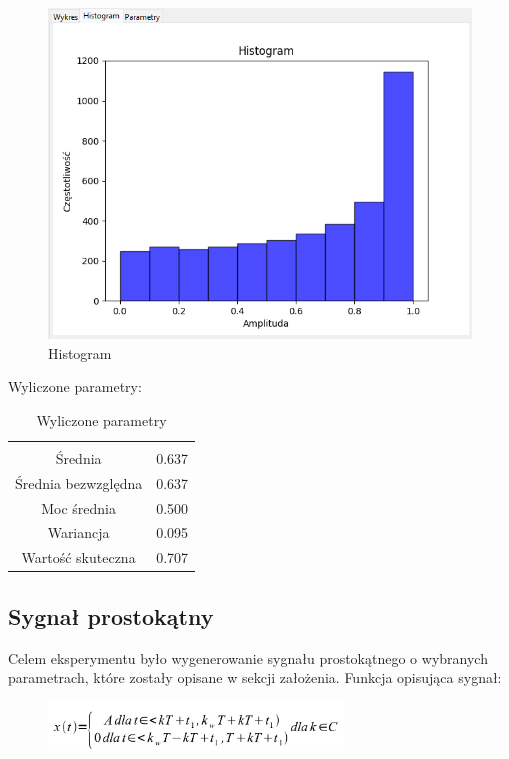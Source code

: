 \documentclass{article}
\begin{document}
\begin{figure}[h!]
    \centering
    \includegraphics[width=\textwidth]{img/sinus-dwu/hist.png}
    \caption{Histogram}
\end{figure}
\FloatBarrier
Wyliczone parametry:
\begin{table}[h!]
    \centering
    \vspace{0.2cm}
    \begin{tabular}{|c|c|}
        \hline\hline\\[-0.4cm]
        Średnia & 0.637  \\
        \hline
        Średnia bezwzględna & 0.637  \\
        \hline
        Moc średnia & 0.500  \\
        \hline
        Wariancja & 0.095 \\
        \hline
        Wartość skuteczna & 0.707 \\
        \hline
    \end{tabular}
    \caption{Wyliczone parametry}
    \label{sinusdwupolowkowy}
\end{table}

\subsection{Sygnał prostokątny} \label{prostokat} 
Celem eksperymentu było wygenerowanie sygnału prostokątnego o wybranych parametrach,
które zostały opisane w sekcji założenia. Funkcja opisująca sygnał:

\begin{figure}[!htbp]
    \centering
    \includegraphics[width=0.7\textwidth]{img/prostokat.png}
\end{figure}
\end{document}
